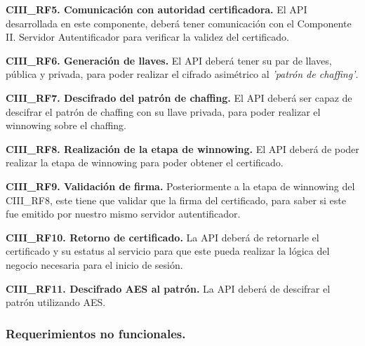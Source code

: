 \documentclass[12pt, a4paper, titlepage]{report}
\begin{document}
    	            
    	            \textbf{CIII\_RF5. Comunicación con autoridad certificadora.} El API desarrollada en este componente, deberá tener comunicación con el Componente II. Servidor Autentificador para verificar la validez del certificado.\\
    	            \label{CIII_RF5}
    	            
    	            \textbf{CIII\_RF6. Generación de llaves.} El API deberá tener su par de llaves, pública y privada, para poder realizar el cifrado asimétrico al \textit{'patrón de chaffing'}.\\
    	            \label{CIII_RF6}
    	            
    	            \textbf{CIII\_RF7. Descifrado del patrón de chaffing.} El API deberá ser capaz de descifrar el patrón de chaffing con su llave privada, para poder realizar el winnowing sobre el chaffing.\\
    	            \label{CIII_RF7}
    	            
    	            \textbf{CIII\_RF8. Realización de la etapa de winnowing.} El API deberá de poder realizar la etapa de winnowing para poder obtener el certificado.\\
    	            \label{CIII_RF8}
    	            
    	            \textbf{CIII\_RF9. Validación de firma.} Posteriormente a la etapa de winnowing del CIII\_RF8, este tiene que validar que la firma del certificado, para saber si este fue emitido por nuestro mismo servidor autentificador. \\
	                \label{CIII_RF9}
	                
	                \textbf{CIII\_RF10. Retorno de certificado.} La API deberá de retornarle el certificado y su estatus al servicio para que este pueda realizar la lógica del negocio necesaria para el inicio de sesión.\\
	                \label{CIII_RF10}
	                
	                \textbf{CIII\_RF11. Descifrado AES al patrón.} La API deberá de descifrar el patrón utilizando AES.\\
	                \label{CIII_RF11}
	       
	            \subsubsection{Requerimientos no funcionales.}
	                
\end{document}
